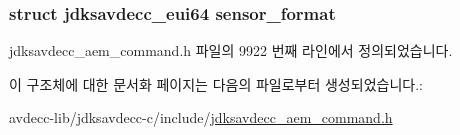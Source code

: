 \subsubsection[{\texorpdfstring{sensor\+\_\+format}{sensor_format}}]{\setlength{\rightskip}{0pt plus 5cm}struct {\bf jdksavdecc\+\_\+eui64} sensor\+\_\+format}\hypertarget{structjdksavdecc__aem__command__get__sensor__format__response_a100aa7be90c95e113ca53584ab78094a}{}\label{structjdksavdecc__aem__command__get__sensor__format__response_a100aa7be90c95e113ca53584ab78094a}


jdksavdecc\+\_\+aem\+\_\+command.\+h 파일의 9922 번째 라인에서 정의되었습니다.



이 구조체에 대한 문서화 페이지는 다음의 파일로부터 생성되었습니다.\+:\begin{DoxyCompactItemize}
\item 
avdecc-\/lib/jdksavdecc-\/c/include/\hyperlink{jdksavdecc__aem__command_8h}{jdksavdecc\+\_\+aem\+\_\+command.\+h}\end{DoxyCompactItemize}
